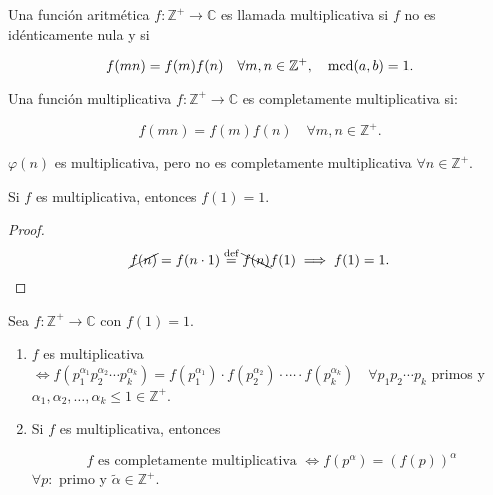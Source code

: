 \begin{definition}
Una función aritmética $f\colon\mathbb{Z}^{+}\rightarrow\mathbb{C}$ es llamada multiplicativa si $f$ no es idénticamente nula y si

\[f(mn)=f(m)f(n)\quad\forall m,n\in\mathbb{Z}^{+},\quad\operatorname{mcd}(a,b)=1.\]

\end{definition}

\begin{definition}
Una función multiplicativa $f\colon\mathbb{Z}^{+}\rightarrow\mathbb{C}$ es completamente multiplicativa si:

\[f(mn)=f(m)f(n)\quad\forall m,n\in\mathbb{Z}^{+}.\]
\end{definition}

\begin{example}
$\varphi(n)$ es multiplicativa, pero no es completamente multiplicativa $\forall n\in\mathbb{Z}^{+}$.
\end{example}

\begin{theorem}
Si $f$ es multiplicativa, entonces $f(1)=1$.
\begin{proof}
\[\cancel{f(n)}=f(n\cdot1)\ddef \bcancel{f(n)}f(1)\implies f(1)=1.\]
\end{proof}
\end{theorem}

\begin{theorem}
Sea $f\colon\mathbb{Z}^{+}\rightarrow\mathbb{C}$ con $f(1)=1$.
\begin{enumerate}
	\item $f$ es multiplicativa $\iff f\left({p}^{\alpha_1}_{1}{p}^{\alpha_2}_{2}\cdots{p}^{\alpha_k}_{k}\right)=f\left({p}^{\alpha_1}_{1}\right)\cdot f\left({p}^{\alpha_2}_{2}\right)\cdot\cdots\cdot f\left({p}^{\alpha_k}_{k}\right)\quad\forall p_1p_2\cdots p_k$ primos y $\alpha_1,\alpha_2,\ldots,\alpha_k\leq1\in\mathbb{Z}^{+}$.
	\item Si $f$ es multiplicativa, entonces

	\[f \text{ es completamente multiplicativa }\iff f\left(p^{\alpha}\right)={\left(f(p)\right)}^{\alpha}\]
	$\forall p\colon$ primo y $\tilde{\alpha}\in\mathbb{Z}^{+}$.
\end{enumerate}
\end{theorem}